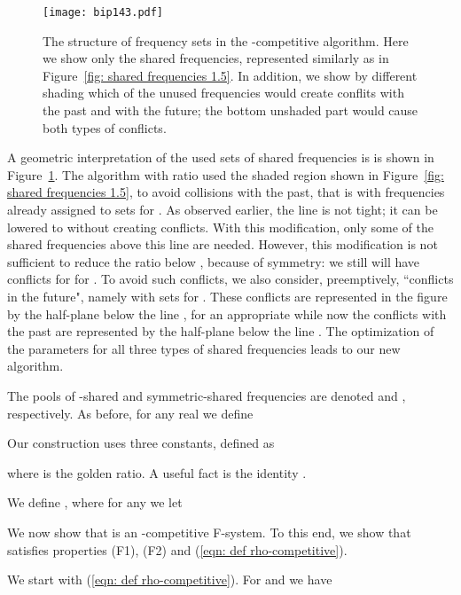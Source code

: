 \documentclass[11pt]{article}
\begin{document}
\begin{figure}[t]
\begin{center}
\texttt{[image: bip143.pdf]}

\caption{The structure of frequency sets in the -competitive
algorithm. Here we show only the shared frequencies, represented
similarly as in Figure~\ref{fig: shared frequencies 1.5}. In addition,
we show by different shading which of the unused frequencies would
create conflits with the past and with the future; the bottom unshaded
part would cause both types of conflicts.}
\label{fig: shared frequencies 1.43}
\end{center}
\end{figure}

A geometric interpretation of the used sets of shared frequencies is
is shown in Figure~\ref{fig: shared frequencies 1.43}.  The algorithm
with ratio  used the shaded region shown in Figure~\ref{fig:
shared frequencies 1.5}, to avoid collisions with the past, that is
with frequencies already assigned to sets  for . As observed earlier, the line  is not tight; it can be
lowered to  without creating conflicts. With this
modification, only some of the shared frequencies above this line are
needed. However, this modification is not sufficient to reduce the
ratio below , because of symmetry: we still will have conflicts
for  for .  To avoid such conflicts, we also
consider, preemptively, ``conflicts in the future", namely with sets
 for . These conflicts are represented in the
figure by the half-plane below the line , for an
appropriate  while now the conflicts with the past are
represented by the half-plane below the line . The
optimization of the parameters for all three types of shared
frequencies leads to our new algorithm.

\medskip

The pools of -shared and symmetric-shared frequencies are denoted
 and , respectively. As before, for any real  we define

Our construction uses three constants, defined as

where  is the golden ratio.
A useful fact is the identity .

We define , where for 
any  we let


We now show that  is an -competitive F-system. To this end, 
we show that  satisfies properties (F1), (F2) and
(\ref{eqn: def rho-competitive}).

We start with (\ref{eqn: def rho-competitive}).
For  and  we have
\end{document}
